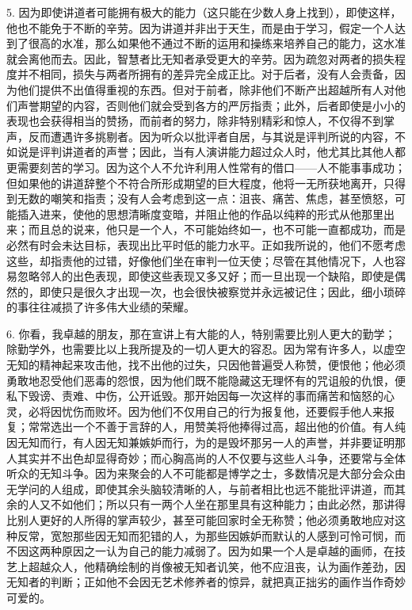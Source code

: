 5. 因为即使讲道者可能拥有极大的能力（这只能在少数人身上找到），即使这样，他也不能免于不断的辛劳。因为讲道并非出于天生，而是由于学习，假定一个人达到了很高的水准，那么如果他不通过不断的运用和操练来培养自己的能力，这水准就会离他而去。因此，智慧者比无知者承受更大的辛劳。因为疏忽对两者的损失程度并不相同，损失与两者所拥有的差异完全成正比。对于后者，没有人会责备，因为他们提供不出值得重视的东西。但对于前者，除非他们不断产出超越所有人对他们声誉期望的内容，否则他们就会受到各方的严厉指责；此外，后者即使是小小的表现也会获得相当的赞扬，而前者的努力，除非特别精彩和惊人，不仅得不到掌声，反而遭遇许多挑剔者。因为听众以批评者自居，与其说是评判所说的内容，不如说是评判讲道者的声誉；因此，当有人演讲能力超过众人时，他尤其比其他人都更需要刻苦的学习。因为这个人不允许利用人性常有的借口——人不能事事成功；但如果他的讲道辞整个不符合所形成期望的巨大程度，他将一无所获地离开，只得到无数的嘲笑和指责；没有人会考虑到这一点：沮丧、痛苦、焦虑，甚至愤怒，可能插入进来，使他的思想清晰度变暗，并阻止他的作品以纯粹的形式从他那里出来；而且总的说来，他只是一个人，不可能始终如一，也不可能一直都成功，而是必然有时会未达目标，表现出比平时低的能力水平。正如我所说的，他们不愿考虑这些，却指责他的过错，好像他们坐在审判一位天使；尽管在其他情况下，人也容易忽略邻人的出色表现，即使这些表现又多又好；而一旦出现一个缺陷，即使是偶然的，即使只是很久才出现一次，也会很快被察觉并永远被记住；因此，细小琐碎的事往往减损了许多伟大业绩的荣耀。\par

6. 你看，我卓越的朋友，那在宣讲上有大能的人，特别需要比别人更大的勤学；除勤学外，也需要比以上我所提及的一切人更大的容忍。因为常有许多人，以虚空无知的精神起来攻击他，找不出他的过失，只因他普遍受人称赞，便恨他；他必须勇敢地忍受他们恶毒的怨恨，因为他们既不能隐藏这无理怀有的咒诅般的仇恨，便私下毁谤、责难、中伤，公开诋毁。那开始因每一次这样的事而痛苦和恼怒的心灵，必将因忧伤而败坏。因为他们不仅用自己的行为报复他，还要假手他人来报复；常常选出一个不善于言辞的人，用赞美将他捧得过高，超出他的价值。有人纯因无知而行，有人因无知兼嫉妒而行，为的是毁坏那另一人的声誉，并非要证明那人其实并不出色却显得奇妙；而心胸高尚的人不仅要与这些人斗争，还要常与全体听众的无知斗争。因为来聚会的人不可能都是博学之士，多数情况是大部分会众由无学问的人组成，即使其余头脑较清晰的人，与前者相比也远不能批评讲道，而其余的人又不如他们；所以只有一两个人坐在那里具有这种能力；由此必然，那讲得比别人更好的人所得的掌声较少，甚至可能回家时全无称赞；他必须勇敢地应对这种反常，宽恕那些因无知而犯错的人，为那些因嫉妒而默认的人感到可怜可悯，而不因这两种原因之一认为自己的能力减弱了。因为如果一个人是卓越的画师，在技艺上超越众人，他精确绘制的肖像被无知者讥笑，他不应沮丧，认为画作差劲，因无知者的判断；正如他不会因无艺术修养者的惊异，就把真正拙劣的画作当作奇妙可爱的。\par

